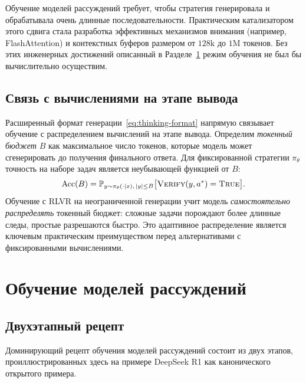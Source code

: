 \begin{remark}
Обучение моделей рассуждений требует, чтобы стратегия генерировала и обрабатывала
очень длинные последовательности. Практическим катализатором этого сдвига стала
разработка эффективных механизмов внимания (например, FlashAttention)
и контекстных буферов размером от $128\text{k}$ до $1\text{M}$ токенов. Без этих
инженерных достижений описанный в
Разделе~\ref{sec:training-reasoning} режим обучения не был бы вычислительно
осуществим.
\end{remark}

\subsection{Связь с вычислениями на этапе вывода}
\label{subsec:cot-inference-compute}

Расширенный формат генерации~\eqref{eq:thinking-format}
напрямую связывает обучение с распределением вычислений на этапе вывода. Определим
\emph{токенный бюджет} $B$ как максимальное число
токенов, которые модель может сгенерировать до получения финального ответа. Для
фиксированной стратегии $\pi_\theta$ точность на наборе задач является
неубывающей функцией от $B$:
\[
\text{Acc}(B) = \mathbb{P}_{y \sim \pi_\theta(\cdot|x),\,|y| \le B}
               \bigl[\textsc{Verify}(y, a^*) = \textsc{True}\bigr].
\]
Обучение с RLVR на неограниченной генерации учит модель
\emph{самостоятельно распределять} токенный бюджет: сложные задачи порождают более длинные
следы, простые разрешаются быстро. Это адаптивное распределение является
ключевым практическим преимуществом перед альтернативами с фиксированными вычислениями.

\section{Обучение моделей рассуждений}
\label{sec:training-reasoning}

\subsection{Двухэтапный рецепт}

Доминирующий рецепт обучения моделей рассуждений состоит из двух
этапов, проиллюстрированных здесь на примере DeepSeek R1 как канонического открытого
примера.

